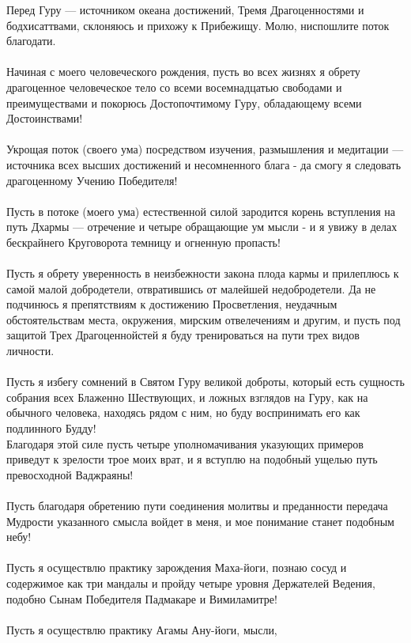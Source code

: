 Перед Гуру — источником океана достижений,
Тремя Драгоце\-нностями и бодхисаттвами,
склоняюсь и прихожу к Прибежищу.
Молю, ниспошлите поток благодати.\\
\\
Начиная с моего человеческого рождения,
пусть во всех жизнях я обрету драгоценное человеческое тело
со всеми восемнадцатью свободами и преимуществами
и покорюсь Дос\-топочтимому Гуру,
обладающему всеми Достоинствами!\\
\\
Укрощая поток (своего ума) посредством изучения,
размышле\-ния и медитации — источника всех
высших достижений и несомненного блага -
да смогу я следовать драгоценному Учению Победителя!\\
\\
Пусть в потоке (моего ума) естественной силой
зародится корень вступления на путь Дхармы —
отречение и четыре обращающие ум мысли -
и я увижу в делах бескрайнего Круго\-ворота
темницу и огненную пропасть!\\
\\
Пусть я обрету уверенность в неизбежности закона плода кармы
и прилеплюсь к самой малой добродетели,
отвратившись от малейшей недобродетели.
Да не подчинюсь я препятствиям к достижению Просветления,
неудачным обстоятельствам места, окружения,
мирским отвелечениям и другим, и пусть под защитой
Трех Драгоценнойстей я буду тренироваться на пути трех видов личности.\\
\\
Пусть я избегу сомнений в Святом Гуру великой доброты,
который есть сущность собрания всех Блаженно Шествующих,
и ложных взглядов на Гуру, как на обычного человека,
находясь рядом с ним, но буду воспринимать его как подлинного Будду!
\\
Благодаря этой силе пусть четыре уполномачивания
указующих примеров приведут к зрелости трое моих врат,
и я вступлю на подобный ущелью путь превосходной Ваджраяны!\\
\\
Пусть благодаря обретению пути соединения молитвы и преда\-нности
передача Мудрости указанного смысла войдет в меня,
и мое понимание станет подобным небу!\\
\\
Пусть я осуществлю практику зарождения Маха-йоги,
познаю сосуд и содержимое как три мандалы и пройду четыре
уровня Держателей Ведения, подобно Сынам Победителя
Падмакаре и Вимиламитре!\\
\\
Пусть я осуществлю практику Агамы Ану-йоги, мысли,
